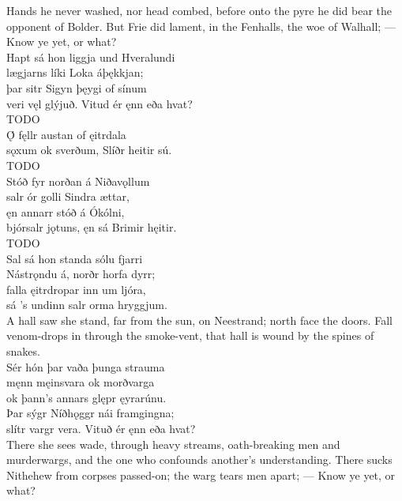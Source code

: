 \bvb Hands he never washed, nor head combed, before onto the pyre he did bear the opponent of Bolder. But Frie did lament, in the Fenhalls, the woe of Walhall; — Know ye yet, or what?\\%

\bva Hapt sá hon liggja \hld und Hveralundi \\%
lægjarns líki \hld Loka áþękkjan; \\%
þar sitr Sigyn \hld þęygi of sínum \\%
veri vęl glýjuð. \hld Vitud ér ęnn eða hvat?\\%

\bvb TODO\\%

\bva Ǫ́ fęllr austan \hld of ęitrdala \\%
sǫxum ok sverðum, \hld Slíðr heitir sú.\\%

\bvb TODO\\%

\bva Stóð fyr norðan \hld á Niðavǫllum \\%
salr ór golli \hld Sindra ættar, \\%
ęn annarr stóð \hld á Ókólni, \\%
bjórsalr jǫtuns, \hld ęn sá Brimir hęitir.\\%

\bvb TODO\\%

\bva Sal sá hon standa \hld sólu fjarri \\%
Nástrǫndu á, \hld norðr horfa dyrr; \\%
falla ęitrdropar \hld inn um ljóra, \\%
sá ’s undinn salr \hld orma hryggjum.\\%

\bvb A hall saw she stand, far from the sun, on Neestrand; north face the doors. Fall venom-drops in through the smoke-vent, that hall is wound by the spines of snakes.\\%

\bva Sér hón þar vaða \hld þunga strauma \\%
męnn męinsvara \hld ok morðvarga \\%
ok þann’s annars glępr \hld ęyrarúnu. \\%
Þar sýgr Níðhǫggr \hld nái framgingna; \\%
slítr vargr vera. \hld Vituð ér ęnn eða hvat?\\%

\bvb There she sees wade, through heavy streams, oath-breaking men and murderwargs, and the one who confounds another’s understanding\footnotemark[1]. There sucks Nithehew from corpses passed-on; the warg tears men apart; — Know ye yet, or what?\\%


